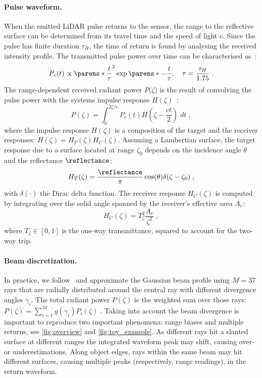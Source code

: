 \paragraph{Pulse waveform.}
When the emitted LiDAR pulse returns to the sensor, the range to the reflective surface can be determined from its travel time and the speed of light $c$. Since the pulse has finite duration $\tau_H$, the time of return is found by analysing the received intensity profile. The transmitted pulse power over time can be characterised as~\cite{carlsson2001signature}:
\begin{equation}
    P_e(t) \propto \parens*{\frac{t}{\tau}}^2 \exp\parens*{-\frac{t}{\tau}},\quad \tau = \frac{\tau_H}{1.75}\;.
\label{eq:pulse}
\end{equation}
The range-dependent received radiant power $P(\zeta$) is the result of convolving the pulse power with the systems impulse response $H(\zeta)$~\cite{rasshofer2011influences,hahner2021fog,hahner2022lidar}:
\begin{equation}
    P(\zeta) = \int_0^{2\zeta/c} P_e(t) H(\zeta - \frac{ct}{2}) \; dt\;,
\end{equation}
where the impulse response $H(\zeta)$ is a composition of the target and the receiver responses: $H(\zeta) =  H_T(\zeta) H_C(\zeta)$.
Assuming a Lambertian surface, the target response due to a surface located at range $\zeta_0$ depends on the incidence angle $\theta$ and the reflectance $\reflectance$:
\begin{equation}
    H_T(\zeta) = \frac{\reflectance}{\pi} \cos(\theta) \delta(\zeta - \zeta_0)\;, 
\label{eq:ht}
\end{equation}
with $\delta(\cdot)$ the Dirac delta function.
The receiver response $H_C(\zeta)$ is computed by integrating over the solid angle spanned by the receiver's effective area $A_e$:
\begin{equation}
   H_C(\zeta) = T^2_{\zeta} \frac{A_e}{\zeta^2}\;,
\label{eq:hc}
\end{equation}
where $T_{\zeta} \in [0,1]$ is the one-way transmittance, squared to account for the two-way trip.


\paragraph{Beam discretization.}
In practice, we follow~\cite{winiwarter2022virtual} and approximate the Gaussian beam profile using $M\!=\!37$ rays that are radially distributed around the central ray with different divergence angles $\gamma_i$. The total radiant power $P(\zeta)$ is the weighted sum over those rays: $P(\zeta) = \sum_{i=1}^M g(\gamma_i) P_i(\zeta)\;.$
Taking into account the beam divergence is important to reproduce two important phenomena: range biases and multiple returns, see \cref{fig:overview} and \cref{fig:toy_example}. As different rays hit a slanted surface at different ranges the integrated waveform peak may shift, causing over- or underestimations. Along object edges, rays within the same beam may hit different surfaces, causing multiple peaks (respectively, range readings), in the return waveform.


